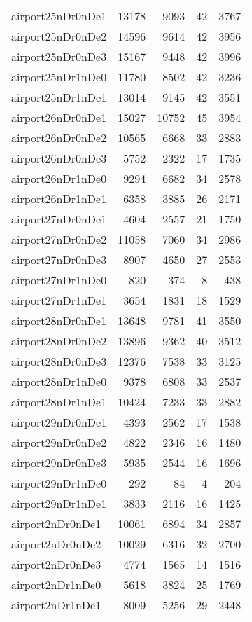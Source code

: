 \begin{longtable}{lrrrr}
airport25nDr0nDe1 & 13178 & 9093 & 42 & 3767 \\
airport25nDr0nDe2 & 14596 & 9614 & 42 & 3956 \\
airport25nDr0nDe3 & 15167 & 9448 & 42 & 3996 \\
airport25nDr1nDe0 & 11780 & 8502 & 42 & 3236 \\
airport25nDr1nDe1 & 13014 & 9145 & 42 & 3551 \\
airport26nDr0nDe1 & 15027 & 10752 & 45 & 3954 \\
airport26nDr0nDe2 & 10565 & 6668 & 33 & 2883 \\
airport26nDr0nDe3 & 5752 & 2322 & 17 & 1735 \\
airport26nDr1nDe0 & 9294 & 6682 & 34 & 2578 \\
airport26nDr1nDe1 & 6358 & 3885 & 26 & 2171 \\
airport27nDr0nDe1 & 4604 & 2557 & 21 & 1750 \\
airport27nDr0nDe2 & 11058 & 7060 & 34 & 2986 \\
airport27nDr0nDe3 & 8907 & 4650 & 27 & 2553 \\
airport27nDr1nDe0 & 820 & 374 & 8 & 438 \\
airport27nDr1nDe1 & 3654 & 1831 & 18 & 1529 \\
airport28nDr0nDe1 & 13648 & 9781 & 41 & 3550 \\
airport28nDr0nDe2 & 13896 & 9362 & 40 & 3512 \\
airport28nDr0nDe3 & 12376 & 7538 & 33 & 3125 \\
airport28nDr1nDe0 & 9378 & 6808 & 33 & 2537 \\
airport28nDr1nDe1 & 10424 & 7233 & 33 & 2882 \\
airport29nDr0nDe1 & 4393 & 2562 & 17 & 1538 \\
airport29nDr0nDe2 & 4822 & 2346 & 16 & 1480 \\
airport29nDr0nDe3 & 5935 & 2544 & 16 & 1696 \\
airport29nDr1nDe0 & 292 & 84 & 4 & 204 \\
airport29nDr1nDe1 & 3833 & 2116 & 16 & 1425 \\
airport2nDr0nDe1 & 10061 & 6894 & 34 & 2857 \\
airport2nDr0nDe2 & 10029 & 6316 & 32 & 2700 \\
airport2nDr0nDe3 & 4774 & 1565 & 14 & 1516 \\
airport2nDr1nDe0 & 5618 & 3824 & 25 & 1769 \\
airport2nDr1nDe1 & 8009 & 5256 & 29 & 2448 \\

\end{longtable}
